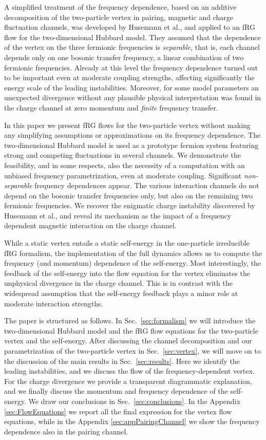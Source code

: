 A simplified treatment of the frequency dependence, based on an additive decomposition of the two-particle vertex in pairing, magnetic and charge fluctuation channels, was developed by Husemann et al., \cite{Husemann2012} and applied to an fRG flow for the two-dimensional Hubbard model. They assumed that the dependence of the vertex on the three fermionic frequencies is {\em separable}, that is, each channel depends only on one bosonic transfer frequency, a linear combination of two fermionic frequencies. Already at this level the frequency dependence turned out to be important even at moderate coupling strengths, affecting significantly the energy scale of the leading instabilities. Moreover, for some model parameters an unexpected divergence without any plausible physical interpretation was found in the charge channel at zero momentum and {\em finite} frequency transfer. \cite{Husemann2012}

In this paper we present fRG flows for the two-particle vertex without making any simplifying assumptions or approximations on its frequency dependence. The two-dimensional Hubbard model is used as a prototype fermion system featuring strong and competing fluctuations in several channels. We demonstrate the feasibility, and in some respects, also the necessity of a computation with an unbiased frequency parametrization, even at moderate coupling. Significant {\em non-separable} frequency dependences appear. The various interaction channels do not depend on the bosonic transfer frequencies only, but also on the remaining two fermionic frequencies. We recover the enigmatic charge instability discovered by Husemann et al., \cite{Husemann2012} and reveal its mechanism as the impact of a frequency dependent magnetic interaction on the charge channel.

While a static vertex entails a static self-energy in the one-particle irreducible fRG formalism, the implementation of the full dynamics allows us to compute the frequency (and momentum) dependence of the self-energy. Most interestingly, the feedback of the self-energy into the flow equation for the vertex eliminates the unphysical divergence in the charge channel. This is in contrast with the widespread assumption that the self-energy feedback plays a minor role at moderate interaction strengths.

The paper is structured as follows. In Sec.~\ref{sec:formalism} we will introduce the two-dimensional Hubbard model and the fRG flow equations for the two-particle vertex and the self-energy.
After discussing the channel decomposition and our parametrization of the two-particle vertex  in Sec.~\ref{sec:vertex}, we will move on to the discussion of the main results in Sec.~\ref{sec:results}. Here we identify the leading instabilities, and we discuss the flow of the frequency-dependent vertex. For the charge divergence we provide a transparent diagrammatic explanation, and we finally discuss the momentum and frequency dependence of the self-energy. We draw our conclusions in Sec.~\ref{sec:conclusions}. In the Appendix \ref{sec:FlowEquations} we report all the final expression for the vertex flow equations, while in the Appendix \ref{sec:appPairingChannel} we show the frequency dependence also in the pairing channel.
